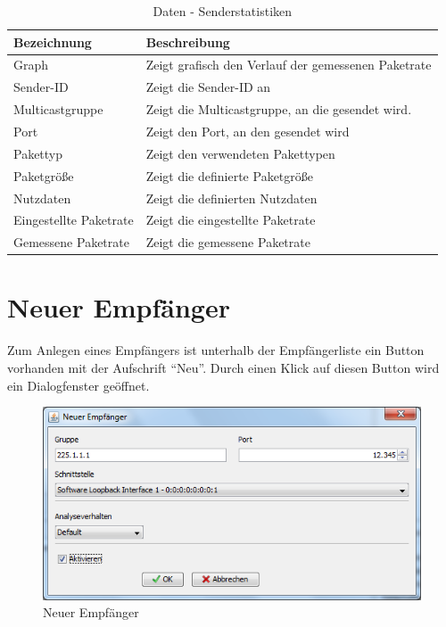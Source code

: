 \begin{table}[h]
\caption{Daten - Senderstatistiken}
\label{tab:showSender}
\begin{center}
\begin{tabular}{|l|p{10cm}|}
\hline
\textbf{Bezeichnung} & \textbf{Beschreibung}\\
\hline
Graph & Zeigt grafisch den Verlauf der gemessenen Paketrate\\
\hline
Sender-ID & Zeigt die Sender-ID an\\
\hline
Multicastgruppe & Zeigt die Multicastgruppe, an die gesendet wird.\\
\hline
Port & Zeigt den Port, an den gesendet wird\\
\hline
Pakettyp & Zeigt den verwendeten Pakettypen\\
\hline
Paketgröße & Zeigt die definierte Paketgröße\\
\hline
Nutzdaten & Zeigt die definierten Nutzdaten\\
\hline
Eingestellte Paketrate & Zeigt die eingestellte Paketrate\\
\hline
Gemessene Paketrate & Zeigt die gemessene Paketrate\\
\hline
\end{tabular}
\end{center}
\label{default}
\end{table}


\chapter{Neuer Empfänger}
Zum Anlegen eines Empfängers ist unterhalb der Empfängerliste
ein Button vorhanden mit der Aufschrift ``Neu''. Durch einen Klick auf diesen
Button wird ein Dialogfenster geöffnet.

\begin{figure}[htbp]
\begin{center}
\includegraphics[width=14cm]{images/addEmpfaenger.png}
\caption[Neuer Empfänger]{Neuer Empfänger}
\label{newSender}
\end{center}
\end{figure}

